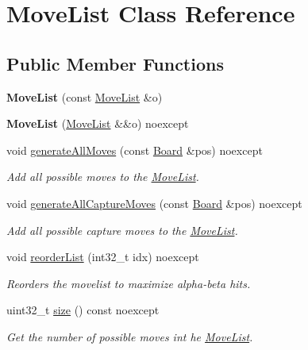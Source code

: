 \hypertarget{classMoveList}{}\section{Move\+List Class Reference}
\label{classMoveList}
\subsection*{Public Member Functions}
\begin{DoxyCompactItemize}
\item 
\mbox{\label{classMoveList_abc6483211a12cbe3764ee5983f9d1fa7}} 
{\bfseries Move\+List} (const \mbox{\hyperlink{classMoveList}{Move\+List}} \&o)
\item 
\mbox{\label{classMoveList_ab9fce85e68b304d522daa3d7940593c6}} 
{\bfseries Move\+List} (\mbox{\hyperlink{classMoveList}{Move\+List}} \&\&o) noexcept
\item 
void \mbox{\hyperlink{classMoveList_a6453c799251a6809fcf9312df1ad0814}{generate\+All\+Moves}} (const \mbox{\hyperlink{classBoard}{Board}} \&pos) noexcept
\begin{DoxyCompactList}\small\item\em Add all possible moves to the \mbox{\hyperlink{classMoveList}{Move\+List}}. \end{DoxyCompactList}\item 
void \mbox{\hyperlink{classMoveList_a30fea5a9f5345fafbf0e67a0aa7e8e82}{generate\+All\+Capture\+Moves}} (const \mbox{\hyperlink{classBoard}{Board}} \&pos) noexcept
\begin{DoxyCompactList}\small\item\em Add all possible capture moves to the \mbox{\hyperlink{classMoveList}{Move\+List}}. \end{DoxyCompactList}\item 
void \mbox{\hyperlink{classMoveList_a24fbd4061fa4ffb33cdb1ab4a5a2001a}{reorder\+List}} (int32\+\_\+t idx) noexcept
\begin{DoxyCompactList}\small\item\em Reorders the movelist to maximize alpha-\/beta hits. \end{DoxyCompactList}\item 
uint32\+\_\+t \mbox{\hyperlink{classMoveList_a4975d53e1bca9fde5bbc9d02242f18e7}{size}} () const noexcept
\begin{DoxyCompactList}\small\item\em Get the number of possible moves int he \mbox{\hyperlink{classMoveList}{Move\+List}}. \end{DoxyCompactList}\item 

\end{DoxyCompactItemize}
